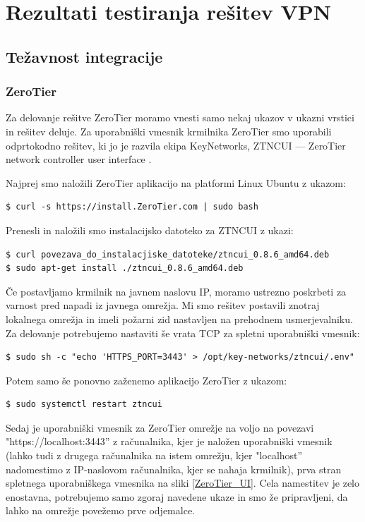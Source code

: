 \documentclass[a4paper, 12pt]{book}
\begin{document}
\chapter{Rezultati testiranja rešitev VPN}
\label{rezultati}
\section{Težavnost integracije}
\subsection{ZeroTier}
Za delovanje rešitve ZeroTier moramo vnesti samo nekaj ukazov v ukazni vrstici in rešitev deluje. Za uporabniški vmesnik krmilnika ZeroTier smo uporabili odprtokodno rešitev, ki jo je razvila ekipa KeyNetworks, ZTNCUI --- ZeroTier network controller user interface \cite{noauthor_key_nodate}.

Najprej smo naložili ZeroTier aplikacijo na platformi Linux Ubuntu z ukazom:
\begin{verbatim}
$ curl -s https://install.ZeroTier.com | sudo bash
\end{verbatim}

Prenesli in naložili smo instalacijsko datoteko za ZTNCUI \cite{noauthor_key_nodate} z ukazi:
\begin{verbatim}
$ curl povezava_do_instalacjiske_datoteke/ztncui_0.8.6_amd64.deb
$ sudo apt-get install ./ztncui_0.8.6_amd64.deb
\end{verbatim}

Če postavljamo krmilnik na javnem naslovu IP, moramo ustrezno poskrbeti za varnost pred napadi iz javnega omrežja. Mi smo rešitev postavili znotraj lokalnega omrežja in imeli požarni zid nastavljen na prehodnem usmerjevalniku.
Za delovanje potrebujemo nastaviti še vrata TCP za spletni uporabniški vmesnik:
\begin{verbatim}
$ sudo sh -c "echo 'HTTPS_PORT=3443' > /opt/key-networks/ztncui/.env"
\end{verbatim}

Potem samo še ponovno zaženemo aplikacijo ZeroTier z ukazom:
\begin{verbatim}
$ sudo systemctl restart ztncui
\end{verbatim}

Sedaj je uporabniški vmesnik za ZeroTier omrežje na voljo na povezavi "https://localhost:3443'' z računalnika, kjer je naložen uporabniški vmesnik (lahko tudi z drugega računalnika na istem omrežju, kjer "localhost'' nadomestimo z IP-naslovom računalnika, kjer se nahaja krmilnik), prva stran spletnega uporabniškega vmesnika na sliki \ref{ZeroTier_UI}. Cela namestitev je zelo enostavna, potrebujemo samo zgoraj navedene ukaze in smo že pripravljeni, da lahko na omrežje povežemo prve odjemalce.
\end{document}
